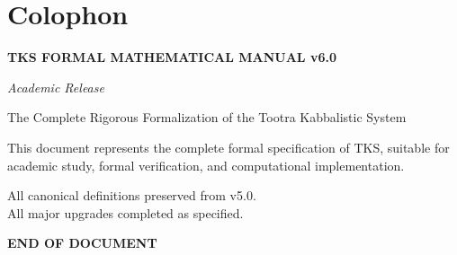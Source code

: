 \backmatter

\chapter*{Colophon}

\begin{center}
\textbf{TKS FORMAL MATHEMATICAL MANUAL v6.0}

\textit{Academic Release}

The Complete Rigorous Formalization of the Tootra Kabbalistic System

\vspace{2em}

This document represents the complete formal specification of TKS, suitable for academic study, formal verification, and computational implementation.

All canonical definitions preserved from v5.0.\\
All major upgrades completed as specified.

\vspace{2em}

\textbf{END OF DOCUMENT}
\end{center}


